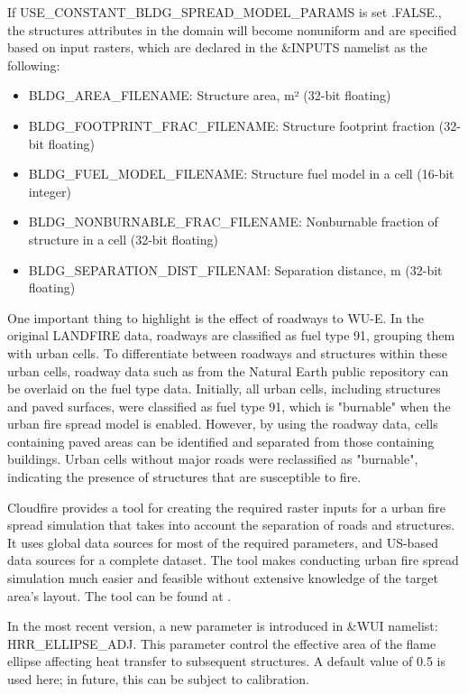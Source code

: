 If USE\_CONSTANT\_BLDG\_SPREAD\_MODEL\_PARAMS is set .FALSE., the structures attributes in the domain will become nonuniform and are specified based on input rasters, which are declared in the \&INPUTS namelist as the following:

\begin{itemize}
    \item BLDG\_AREA\_FILENAME: Structure area, m² (32-bit floating)
    \item BLDG\_FOOTPRINT\_FRAC\_FILENAME: Structure footprint fraction (32-bit floating)
    \item BLDG\_FUEL\_MODEL\_FILENAME: Structure fuel model in a cell (16-bit integer)
    \item BLDG\_NONBURNABLE\_FRAC\_FILENAME: Nonburnable fraction of structure in a cell (32-bit floating)
    \item BLDG\_SEPARATION\_DIST\_FILENAM: Separation distance, m (32-bit floating)
\end{itemize}

One important thing to highlight is the effect of roadways to WU-E. In the original LANDFIRE data, roadways are classified as fuel type 91, grouping them with urban cells. To differentiate between roadways and structures within these urban cells, roadway data such as from the Natural Earth public repository can be overlaid on the fuel type data. Initially, all urban cells, including structures and paved surfaces, were classified as fuel type 91, which is "burnable" when the urban fire spread model is enabled. However, by using the roadway data, cells containing paved areas can be identified and separated from those containing buildings. Urban cells without major roads were reclassified as "burnable", indicating the presence of structures that are susceptible to fire.

Cloudfire provides a tool for creating the required raster inputs for a urban fire spread simulation that takes into account the separation of roads and structures. It uses global data sources for most of the required parameters, and US-based data sources for a complete dataset. The tool makes conducting urban fire spread simulation much easier and feasible without extensive knowledge of the target area's layout. The tool can be found at .

In the most recent version, a new parameter is introduced in \&WUI namelist: HRR\_ELLIPSE\_ADJ. This parameter control the effective area of the flame ellipse affecting heat transfer to subsequent structures. A default value of 0.5 is used here; in future, this can be subject to calibration.

